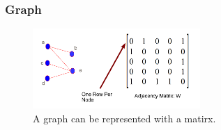\documentclass[notheorems,mathserif,table,compress]{beamer}  %
\begin{document}

\begin{frame}
\frametitle{Graph}
    \begin{figure}[!ht]
     \centering
     \includegraphics[width=2.5in]{graph.png} \\
      A graph can be represented with a matirx.
     \end{figure}
\end{frame}
\end{document}
